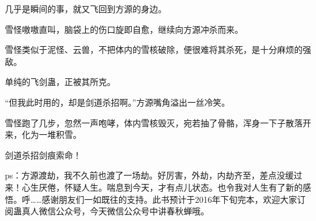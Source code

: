 \begin{this_body}
几乎是瞬间的事，就又飞回到方源的身边。

雪怪嗷嗷直叫，脑袋上的伤口旋即自愈，继续向方源冲杀而来。

雪怪类似于泥怪、云兽，不把体内的雪核破除，便很难将其杀死，是十分麻烦的强敌。

单纯的飞剑蛊，正被其所克。

“但我此时用的，却是剑道杀招啊。”方源嘴角溢出一丝冷笑。

雪怪跑了几步，忽然一声咆哮，体内雪核毁灭，宛若抽了骨骼，浑身一下子散落开来，化为一堆积雪。

剑道杀招剑痕索命！

ps：方源渡劫，我不久前也渡了一场劫。好厉害，外劫，内劫齐至，差点没缓过来！心生厌倦，怀疑人生。喘息到今天，才有点儿状态。也令我对人生有了新的感悟。呼……感谢朋友们一如既往的支持。此书预计于2016年下旬完本，欢迎大家订阅蛊真人微信公众号，今天微信公众号中讲春秋蝉哦。

\end{this_body}

